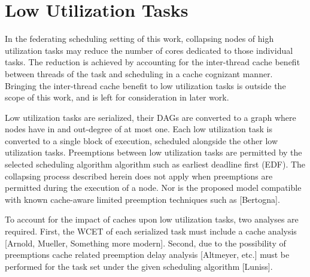 \section{Low Utilization Tasks}

In the federating scheduling setting of this work, collapsing nodes of
high utilization tasks may reduce the number of cores dedicated to
those individual tasks. The reduction is achieved by accounting for
the inter-thread cache benefit between threads of the task and
scheduling in a cache cognizant manner. Bringing the inter-thread
cache benefit to low utilization tasks is outside the scope of this
work, and is left for consideration in later work.

Low utilization tasks are serialized, their DAGs are converted to a
graph where nodes have in and out-degree of at most one. Each low
utilization task is converted to a single block of execution,
scheduled alongside the other low utilization tasks. Preemptions
between low utilization tasks are permitted by the selected scheduling
algorithm algorithm such as earliest deadline first (EDF). The
collapsing process described herein does not apply when preemptions
are permitted during the execution of a node. Nor is the proposed
model compatible with known cache-aware limited preemption techniques
such as \addcite{} [Bertogna].

To account for the impact of caches upon low utilization tasks, two
analyses are required. First, the WCET of each serialized task must
include a cache analysis \addcite{} [Arnold, Mueller, Something more
  modern]. Second, due to the possibility of preemptions cache related
preemption delay analysis \addcite{} [Altmeyer, etc.] must be
performed for the task set under the given scheduling algorithm
\addcite{} [Luniss].
